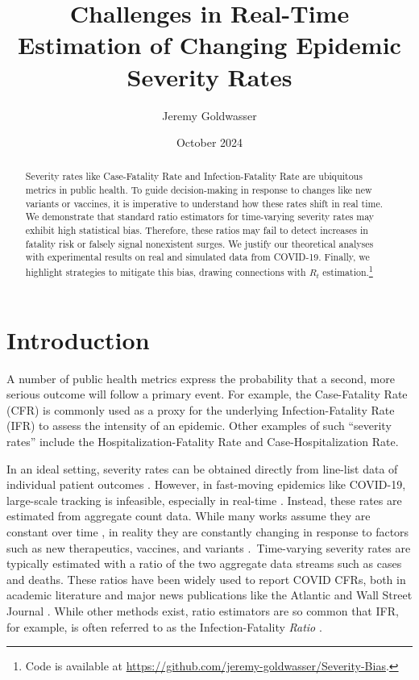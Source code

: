 \documentclass{article}
\title{Challenges in Real-Time Estimation of Changing Epidemic Severity Rates}
\author{Jeremy Goldwasser}
\date{October 2024}
\begin{document}
\maketitle
\begin{abstract}
    Severity rates like Case-Fatality Rate and Infection-Fatality Rate are ubiquitous metrics in public health. To guide decision-making in response to changes like new variants or vaccines, it is imperative to understand how these rates shift in real time. We demonstrate that standard ratio estimators for time-varying severity rates may exhibit high statistical bias. Therefore, these ratios may fail to detect increases in fatality risk or falsely signal nonexistent surges. We justify our theoretical analyses with experimental results on real and simulated data from COVID-19. Finally, we highlight strategies to mitigate this bias, drawing connections with $R_t$ estimation.\footnote{Code is available at \url{https://github.com/jeremy-goldwasser/Severity-Bias}.}
\end{abstract}
\section{Introduction}

A number of public health metrics express the probability that a second, more serious outcome will follow a primary event. For example, the Case-Fatality Rate (CFR) is commonly used as a proxy for the underlying Infection-Fatality Rate (IFR) to assess the intensity of an epidemic. Other examples of such “severity rates” include the Hospitalization-Fatality Rate and Case-Hospitalization Rate. 

In an ideal setting, severity rates can be obtained directly from line-list data of individual patient outcomes \citep{HFR_line_list1,HFR_linelist2,HFR_linelist3,cfr_line_list}. However, in fast-moving epidemics like COVID-19, large-scale tracking is infeasible, especially in real-time \citep{UKpaper}. Instead, these rates are estimated from aggregate count data. While many works assume they are constant over time \citep{reich2012estimating,ghani,jewell2007nonparametric,lancet_controversial}, in reality they are constantly changing in response to factors such as new therapeutics, vaccines, and variants \citep{nyt}. Time-varying severity rates are typically estimated with a ratio of the two aggregate data streams such as cases and deaths. These ratios have been widely used to report COVID CFRs, both in academic literature \citep{germany,horita2022global,timevar_ifr,yuan2020monitoring,LIU2023100350} and major news publications like the Atlantic \citep{atlantic} and Wall Street Journal \citep{wsj}. While other methods exist, ratio estimators are so common that IFR, for example, is often referred to as the Infection-Fatality \textit{Ratio} \citep{timevar_ifr, lancet_ifr}.
\end{document}
